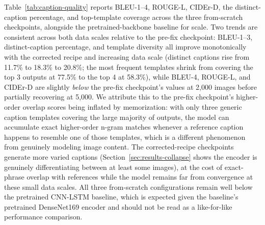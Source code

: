 \documentclass[conference]{IEEEtran}
\begin{document}
Table~\ref{tab:caption-quality} reports BLEU-1--4, ROUGE-L, CIDEr-D, the distinct-caption percentage, and top-template coverage across the three from-scratch checkpoints, alongside the pretrained-backbone baseline for scale. Two trends are consistent across both data scales relative to the pre-fix checkpoint: BLEU-1--3, distinct-caption percentage, and template diversity all improve monotonically with the corrected recipe and increasing data scale (distinct captions rise from 11.7\% to 18.3\% to 20.8\%; the most frequent templates shrink from covering the top 3 outputs at 77.5\% to the top 4 at 58.3\%), while BLEU-4, ROUGE-L, and CIDEr-D are slightly \emph{below} the pre-fix checkpoint's values at 2,000 images before partially recovering at 5,000. We attribute this to the pre-fix checkpoint's higher-order overlap scores being inflated by memorization: with only three generic caption templates covering the large majority of outputs, the model can accumulate exact higher-order n-gram matches whenever a reference caption happens to resemble one of those templates, which is a different phenomenon from genuinely modeling image content. The corrected-recipe checkpoints generate more varied captions (Section~\ref{sec:results-collapse} shows the encoder is genuinely differentiating between at least some images), at the cost of exact-phrase overlap with references while the model remains far from convergence at these small data scales. All three from-scratch configurations remain well below the pretrained CNN-LSTM baseline, which is expected given the baseline's pretrained DenseNet169 encoder and should not be read as a like-for-like performance comparison.
\end{document}
